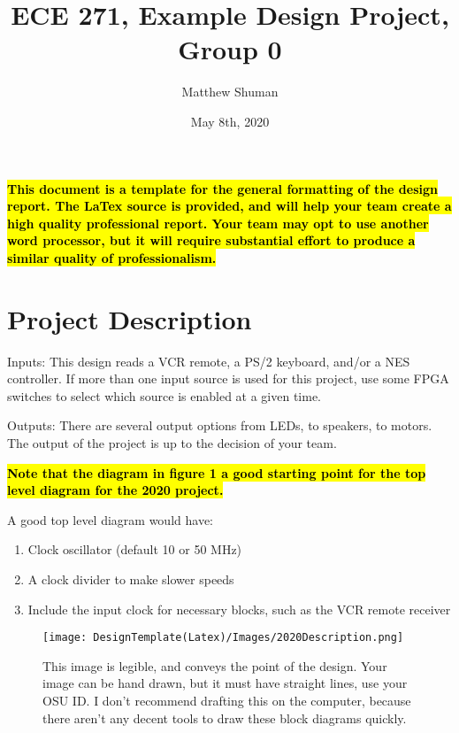 \documentclass[a4paper]{article}
\title{ECE 271, Example Design Project, Group 0}
\author{Matthew Shuman}
\date{May 8th, 2020}
\begin{document}

\maketitle
\tableofcontents
\newpage
\textbf{\textcolor{red}{\hl{This document is a template for the general formatting of the design report.  The LaTex source is provided, and will help your team create a high quality professional report. Your team may opt to use another word processor, but it will require substantial effort to produce a similar quality of professionalism. }}}
\section{Project Description}
Inputs:  This design reads a VCR remote, a PS/2 keyboard, and/or a NES controller.  If more than one input source is used for this project, use some FPGA switches to select which source is enabled at a given time.

Outputs:  There are several output options from LEDs, to speakers, to motors.  The output of the project is up to the decision of your team.  

\textbf{\textcolor{red}{\hl{Note that the diagram in figure 1 a good starting point for the top level diagram for the 2020 project.  }}}


\vspace{.25in}
A good top level diagram would have:
\begin{enumerate}
\item Clock oscillator (default 10 or 50 MHz)
\item A clock divider to make slower speeds
\item Include the input clock for necessary blocks, such as the VCR remote receiver
\end{enumerate}

\begin{figure}[h]
  \centering
    \texttt{[image: DesignTemplate(Latex)/Images/2020Description.png]}
	\caption{This image is legible, and conveys the point of the design.  Your image can be hand drawn, but it must have straight lines, use your OSU ID.  I don't recommend drafting this on the computer, because there aren't any decent tools to draw these block diagrams quickly.}
    \label{fig:2018Desc}
\end{figure}
\end{document}
